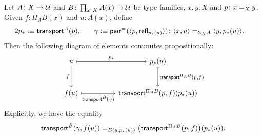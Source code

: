 \begin{thm}\label{thm:dependent-transport-decomp}
    Let\/ $A\colon X\to\univ$ and\/ $B\colon\prod_{x\colon X}A(x)\to\univ$ be type families,\/ $x,y\colon X$ and\/ $p\colon x\eq Xy$. Given\/ $f\colon \Pi_A B(x)$ and\/ $u\colon A(x)$, define
    \begin{alignat*}2
        p_*&\defeq\fun{transport}^A(p),
        &\quad\gamma&\defeq\fun{pair}^{\eq{}}(\dep{p,\fun{refl}_{p_*(u)}})
            \colon\dep{x,u}\eq{\Sigma_XA}\dep{y,p_*(u)}.
    \end{alignat*}
    Then the following diagram of elements commutes propositionally:
    \[
        \begin{tikzcd}[column sep=huge,row sep=large]
            u
                \arrow[r,mapsto,"p_*"]
                \arrow[d,mapsto,"f"']
            &p_*(u)
                \arrow[d,
                    mapsto,
                    "{\fun{transport}^{\Pi_A B}(p,f)}"] 
        \\
            f(u)
                \arrow[r,mapsto,"\fun{transport}^{\hat B}(\gamma)"']
        &\fun{transport}^{\Pi_A B}(p,f)(p_*(u))
        \end{tikzcd}
    \]
    Explicitly, we have the equality
    \[
        \mathsf{transport}^{\hat B}(\gamma,f(u))
        \mathrel{=_{B(y,p_*(u))}}
        \bigl(\mathsf{transport}^{\Pi_A B}(p,f)\bigr)(p_*(u)).
    \]
\end{thm}


